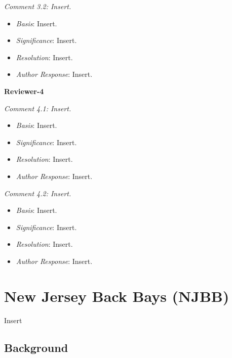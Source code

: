 \documentclass[
]{book}
\providecommand{\tightlist}{%
  \setlength{\itemsep}{0pt}\setlength{\parskip}{0pt}}
\begin{document}
\emph{Comment 3.2: Insert.}

\begin{itemize}
\tightlist
\item
  \emph{Basis}: Insert.\\
\item
  \emph{Significance}: Insert.\\
\item
  \emph{Resolution}: Insert.\\
\item
  \emph{Author Response}: Insert.
\end{itemize}

\textbf{Reviewer-4}

\emph{Comment 4.1: Insert.}

\begin{itemize}
\tightlist
\item
  \emph{Basis}: Insert.\\
\item
  \emph{Significance}: Insert.\\
\item
  \emph{Resolution}: Insert.\\
\item
  \emph{Author Response}: Insert.
\end{itemize}

\emph{Comment 4.2: Insert.}

\begin{itemize}
\tightlist
\item
  \emph{Basis}: Insert.\\
\item
  \emph{Significance}: Insert.\\
\item
  \emph{Resolution}: Insert.\\
\item
  \emph{Author Response}: Insert.
\end{itemize}

\hypertarget{new-jersey-back-bays-njbb}{%
\chapter{New Jersey Back Bays (NJBB)}\label{new-jersey-back-bays-njbb}}

Insert

\hypertarget{background}{%
\section{Background}\label{background}}
\end{document}
